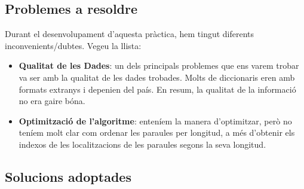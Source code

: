 \documentclass[conference]{IEEEtran}
\begin{document}
\subsection{Problemes a resoldre}
    Durant el desenvolupament d'aquesta pràctica, hem tingut diferents inconvenients/dubtes. Vegeu la llista:

    \begin{itemize}
        \item \textbf{Qualitat de les Dades}: un dels principals problemes que ens varem trobar va ser amb la qualitat de les dades trobades. Molts de diccionaris eren amb formats extranys i depenien del país. En resum, la qualitat de la informació no era gaire bóna.


        \item \textbf{Optimització de l'algoritme}: enteníem la manera d'optimitzar, però no teníem molt clar com ordenar les paraules per longitud, a més d'obtenir els indexos de les localitzacions de les paraules segons la seva longitud.

    \end{itemize}
    \subsection{Solucions adoptades}
\end{document}

